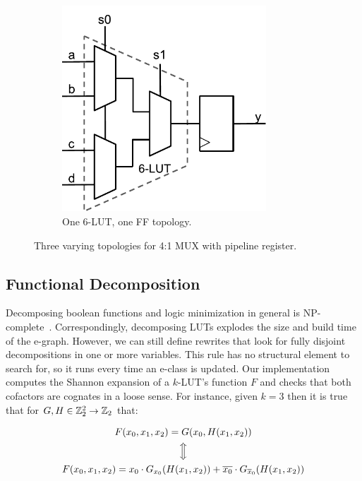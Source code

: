 \begin{figure}[tb]
\begin{subfigure}{0.38\textwidth}
    \end{subfigure}
    \begin{subfigure}{0.30\textwidth}
        \centering
        \includegraphics[width=0.84\textwidth]{img/mux_4_1_retime.pdf}
        \caption{One 6-LUT, one FF topology.}\label{fig:retiming:c}
    \end{subfigure}
    \caption{Three varying topologies for 4:1 MUX with pipeline register.}\label{fig:retiming}
\end{figure}

\subsection{Functional Decomposition}\label{sec:rewrites:decomp}

Decomposing boolean functions and logic minimization in general is
NP-complete~\cite{logicmin}. Correspondingly, decomposing LUTs explodes the
size and build time of the e-graph. However, we can still define rewrites that
look for fully disjoint decompositions in one or more variables. This rule has
no structural element to search for, so it runs every time an e-class is
updated. Our implementation computes the Shannon expansion of a $k$-LUT's
function $F$ and checks that both cofactors are cognates in a loose sense. For
instance, given $k=3$ then it is true that for $G, H \in \mathbb{Z}_{2}^2 \rightarrow \mathbb{Z}_{2}$
that:

\begin{gather}
    F(x_0, x_1, x_2) = G(x_0, H(x_1, x_2)) \nonumber \\
    \Big\Updownarrow                       \nonumber \\
    F(x_0, x_1, x_2) = x_0 \cdot G_{x_0} (H(x_1, x_2)) +  \overline{x_0} \cdot G_{\overline{x}_0} (H(x_1, x_2))
\end{gather}

